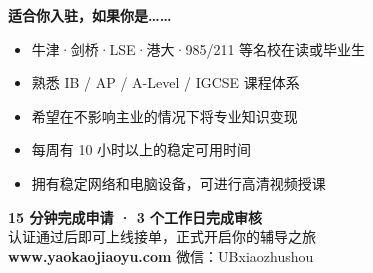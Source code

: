 \documentclass[a4paper,11pt]{article}
\begin{document}
\begin{center}
\begin{tcolorbox}[
  enhanced, colback=white, colframe=GrayBorder,
  boxrule=0.8pt, arc=10pt,
  width=0.9\textwidth,
  left=16pt, right=16pt, top=14pt, bottom=14pt
]
  {\color{BrandBlue}\bfseries\large 适合你入驻，如果你是……}\\[10pt]
  \begin{itemize}[leftmargin=1.4em, itemsep=6pt, label={\color{GreenOk}}]
    \item {\color{GrayDark} 牛津·剑桥·LSE·港大·985/211 等名校在读或毕业生}
    \item {\color{GrayDark} 熟悉 IB / AP / A-Level / IGCSE 课程体系}
    \item {\color{GrayDark} 希望在不影响主业的情况下将专业知识变现}
    \item {\color{GrayDark} 每周有 10 小时以上的稳定可用时间}
    \item {\color{GrayDark} 拥有稳定网络和电脑设备，可进行高清视频授课}
  \end{itemize}
\end{tcolorbox}
\end{center}

\vfill

\begin{center}
  \begin{tcolorbox}[
    enhanced, colback=BrandBlue, colframe=BrandBlue,
    arc=10pt, width=0.9\textwidth, nobeforeafter,
    left=20pt, right=20pt, top=16pt, bottom=16pt
  ]
    \centering
    {\color{BrandGold}\bfseries\Large 15 分钟完成申请 · 3 个工作日完成审核}\\[8pt]
    {\color{white!80} 认证通过后即可上线接单，正式开启你的辅导之旅}\\[12pt]
    {\color{BrandGold}\bfseries www.yaokaojiaoyu.com}
    \quad{\color{white!40}|}\quad
    {\color{white!70}\small 微信：UBxiaozhushou}
  \end{tcolorbox}

  \vspace{8mm}
\end{center}

\newpage

\end{document}
